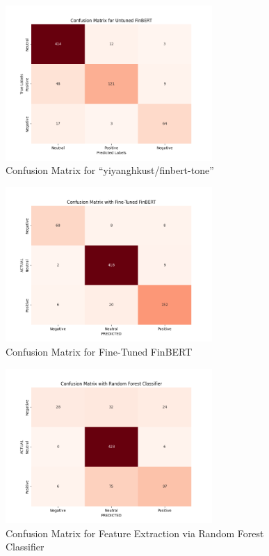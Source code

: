 \documentclass{article}
\begin{document}
\begin{figure}[!htbp]
    \centering
    \includegraphics[width=0.7\textwidth]{assets/conf_mat_untuned.png}
    \caption{Confusion Matrix for ``yiyanghkust/finbert-tone''}
    \label{fig:untuned}
\end{figure}

\begin{figure}[!htbp]
    \centering
    \includegraphics[width=0.7\textwidth]{assets/conf_mat_finetuned.png}
    \caption{Confusion Matrix for Fine-Tuned FinBERT}
    \label{fig:finetuned}
\end{figure}

\newpage 

\begin{figure}
    \centering
    \includegraphics[width=0.7\textwidth]{assets/conf_mat_for_rfc.png}
    \caption{Confusion Matrix for Feature Extraction via Random Forest Classifier}
    \label{fig:rfc}
\end{figure}
\end{document}
